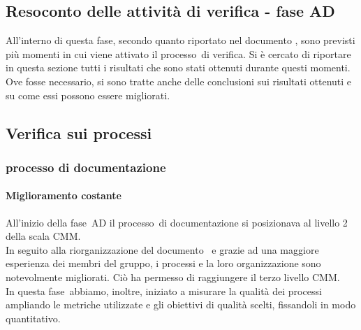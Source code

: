 \documentclass[../PianoDiQualifica.tex]{subfiles}
\begin{document}
\begin{appendices}
\section{Resoconto delle attività di verifica - fase AD}
All'interno di questa fase\g, secondo quanto riportato nel documento \pianodiprogetto, sono previsti più momenti in cui viene attivato il processo\g\ di verifica. Si è cercato di riportare in questa sezione tutti i risultati che sono stati ottenuti durante questi momenti. Ove fosse necessario, si sono tratte anche delle conclusioni sui risultati ottenuti e su come essi possono essere migliorati.
	
	\subsection{Verifica sui processi}
		\subsubsection{processo di documentazione}
			\paragraph{Miglioramento costante}
			All'inizio della fase\g\ AD il processo\g\ di documentazione si posizionava al livello 2 della scala CMM\g.\\
			In seguito alla riorganizzazione del documento \normediprogetto\ e grazie ad una maggiore esperienza dei membri del gruppo, i processi e la loro organizzazione sono notevolmente migliorati. Ciò ha permesso di raggiungere il terzo livello CMM\g.\\
			In questa fase\g\ abbiamo, inoltre, iniziato a misurare la qualità dei processi ampliando le metriche utilizzate e gli obiettivi di qualità scelti, fissandoli in modo quantitativo.
			

\end{appendices}
\end{document}
